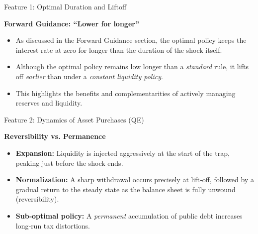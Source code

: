 \documentclass[11pt,aspectratio=169]{beamer}
\begin{document}
\begin{frame}{Feature 1: Optimal Duration and Liftoff}
\small

\textbf{Forward Guidance: “Lower for longer”}
\begin{itemize}
    \item As discussed in the Forward Guidance section, the optimal policy keeps the interest rate at zero for longer than the duration of the shock itself.
    \item Although the optimal policy remains low longer than a \textit{standard} rule, it lifts off \textit{earlier} than under a \textit{constant liquidity policy}.
    \item This highlights the benefits and complementarities of actively managing reserves and liquidity.
\end{itemize}

\end{frame}


\begin{frame}{Feature 2: Dynamics of Asset Purchases (QE)}
\small

\textbf{Reversibility vs. Permanence}
\begin{itemize}
    \item \textbf{Expansion:} Liquidity is injected aggressively at the start of the trap, peaking just before the shock ends.
    \item \textbf{Normalization:} A sharp withdrawal occurs precisely at lift‑off, followed by a gradual return to the steady state as the balance sheet is fully unwound (reversibility).
    \item \textbf{Sub‑optimal policy:} A \emph{permanent} accumulation of public debt increases long‑run tax distortions.
\end{itemize}
\end{frame}
\end{document}
